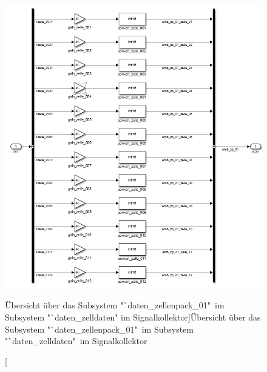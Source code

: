 \documentclass[fontsize = 12pt, paper = a4]{scrreprt}
\begin{document}
\begin{figure}[h]
\centering
\includegraphics[scale = 0.8]{sc_daten_zellenpack}
\caption[Übersicht über das Subsystem "`daten\_zellenpack\_01"\ im Subsystem  "`daten\_zelldaten" im Signalkollektor]{Übersicht über das Subsystem "`daten\_zellenpack\_01"\ im Subsystem  "`daten\_zelldaten"\ im Signalkollektor}
\label{scdatenzellenpack}
\end{figure}


\newpage
\end{document}
